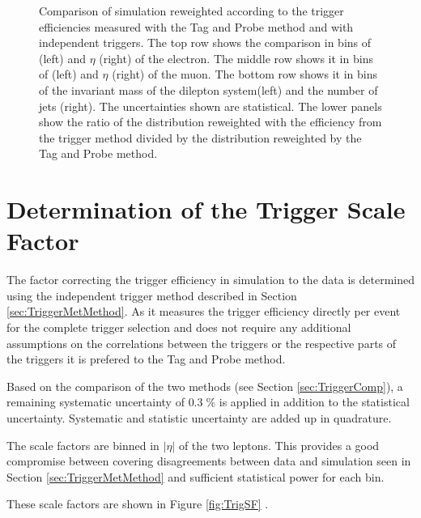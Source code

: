 \begin{figure}[htbp!]
\begin{center}
      \caption{Comparison of \ttbar simulation reweighted according to the trigger efficiencies measured with the Tag and Probe method and with independent \ETm triggers.
       The top row shows the comparison in bins of \pt (left) and $\eta$ (right) of the electron. The middle row shows it in bins of \pt (left) and $\eta$ (right) of the muon. The bottom row shows it in bins of the invariant mass of the dilepton system(left) and the number of jets (right). The uncertainties shown are statistical. The lower panels show the ratio of the distribution reweighted with the efficiency from the \ETm trigger method divided by the distribution reweighted by the Tag and Probe method. }  
    \label{fig:Clos_emu}
  \end{center}
\end{figure}

\section{Determination of the Trigger Scale Factor}

\label{sec:TrigSF}

The factor correcting the trigger efficiency in simulation to the data is determined using the independent trigger method described in Section \ref{sec:TriggerMetMethod}. 
As it measures the trigger efficiency directly per event for the complete trigger selection and does not require any additional assumptions on the correlations between the triggers or the respective parts of the triggers it is prefered to the Tag and Probe method. 

Based on the comparison of the two methods (see Section \ref{sec:TriggerComp}), a remaining systematic uncertainty of $0.3\;\%$ is applied in addition to the statistical uncertainty.
Systematic and statistic uncertainty are added up in quadrature. 

The scale factors are binned in $|\eta|$ of the two leptons. This provides a good compromise between covering disagreements between data and simulation seen in Section \ref{sec:TriggerMetMethod} and sufficient statistical power for each bin.

These scale factors are shown in Figure \ref{fig:TrigSF} .

